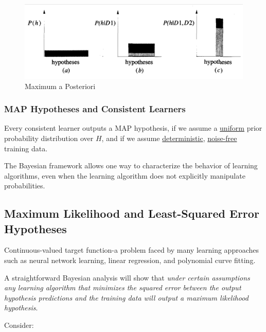 \begin{figure}[H]
  \centering
  \includegraphics[width=1\textwidth]{./2023May/MAP.png}
  \caption{Maximum a Posteriori}
  \label{MAP}
\end{figure}

\hypertarget{map-hypotheses-and-consistent-learners}{%
\subsubsection{MAP Hypotheses and Consistent
Learners}\label{map-hypotheses-and-consistent-learners}}

Every consistent learner outputs a MAP hypothesis, if we assume a
\ul{uniform} prior probability distribution over \(H\), and if we assume
\ul{deterministic}, \ul{noise-free} training data.

The Bayesian framework allows one way to characterize the behavior of
learning algorithms, even when the learning algorithm does not
explicitly manipulate probabilities.

\hypertarget{maximum-likelihood-and-least-squared-error-hypotheses}{%
\subsection{Maximum Likelihood and Least-Squared Error
Hypotheses}\label{maximum-likelihood-and-least-squared-error-hypotheses}}

Continuous-valued target function-a problem faced by many learning
approaches such as neural network learning, linear regression, and
polynomial curve fitting.

A straightforward Bayesian analysis will show that \emph{under certain
assumptions any learning algorithm that minimizes the squared error
between the output hypothesis predictions and the training data will
output a maximum likelihood hypothesis}.

Consider:

